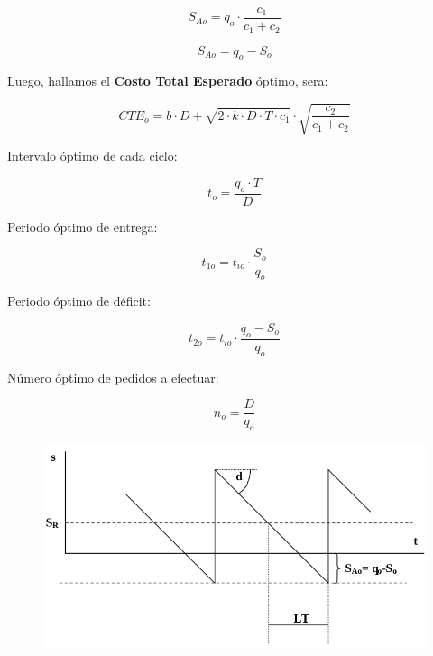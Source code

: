 \documentclass{article}
\begin{document}
\begin{equation}
    S_{Ao} = q_o \cdot \frac{c_1}{c_1 + c_2}
\end{equation}


\begin{equation}
    S_{Ao} = q_o - S_o
\end{equation}

Luego, hallamos el \textbf{Costo Total Esperado} óptimo, sera:

\begin{equation}
    CTE_o = b \cdot D + \sqrt{2 \cdot k \cdot D \cdot T \cdot c_1} \cdot \sqrt{\frac{c_2}{c_1 + c_2}}
\end{equation}


Intervalo óptimo de cada ciclo:

\begin{equation}
    t_o = \frac{q_o \cdot T}{D}
\end{equation}

Periodo óptimo de entrega:

\begin{equation}
    t_{1o} = t_{io} \cdot \frac{S_o}{q_o}
\end{equation}

Periodo óptimo de déficit:

\begin{equation}
    t_{2o} = t_{io} \cdot \frac{q_o - S_o}{q_o}
\end{equation}

Número óptimo de pedidos a efectuar:

\begin{equation}
    n_o = \frac{D}{q_o}
\end{equation}


\newpage
\begin{figure}[h!]
    \includegraphics[width=\linewidth]{imagenes/stock-reorden-agotamiento.png}
\end{figure}
\end{document}
